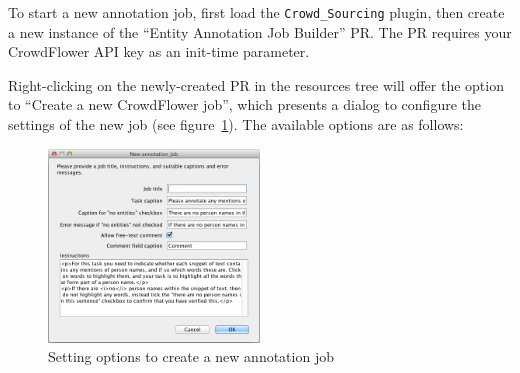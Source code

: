 
To start a new annotation job, first load the \verb!Crowd_Sourcing! plugin,
then create a new instance of the ``Entity Annotation Job Builder'' PR.
The PR requires your CrowdFlower API key as an init-time parameter.

Right-clicking on the newly-created PR in the resources tree will offer the
option to ``Create a new CrowdFlower job'', which presents a dialog to
configure the settings of the new job (see
figure~\ref{fig:crowd:new-annotation-job}).  The available options are as
follows:

\begin{figure}[tb]
  \centering
  \includegraphics[width=0.5\textwidth]{new-annotation-job-dialog.png}
  \caption{Setting options to create a new annotation job}
  \label{fig:crowd:new-annotation-job}
\end{figure}

